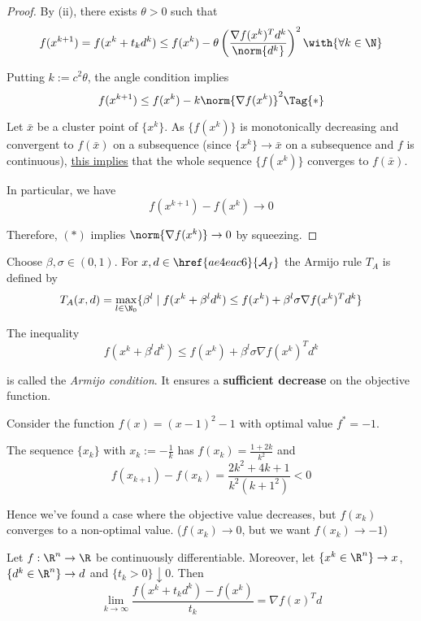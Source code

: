 \begin{proof}
  By (ii), there exists $\theta>0$ such that
  $$
    f(x^{k+1})=f(x^k+t_kd^k)\leq
    f(x^k)-\theta\left(
    \frac{\nabla f(x^k)^Td^k}{\norm{d^k}}
    \right)^2\with{\forall k\in\N}
  $$

  Putting $k:=c^2\theta$, the angle condition implies
  \begin{equation*}
    f(x^{k+1})\leq f(x^k)-k\norm{\nabla f(x^k)}^2\Tag{*}
  \end{equation*}

  Let $\bar x$ be a cluster point of $\{x^k\}$. As $\{f(x^k)\}$ is
  monotonically decreasing and convergent to $f(\bar x)$ on a subsequence
  (since $\{x^k\}\to\bar x$ on a subsequence and $f$ is continuous),
  \href{aaf3ba6}{this implies} that the whole sequence $\{f(x^k)\}$ converges
  to $f(\bar x)$.

  In particular, we have
  $$
    f(x^{k+1})-f(x^k)\to0
  $$

  Therefore, $(*)$ implies $\norm{\nabla f(x^k)}\to0$ by squeezing.
\end{proof}

\label{fefb024}

Choose $\beta,\sigma\in(0,1)$. For $x,d\in\href{ae4eac6}{\mathcal A_f}$ the
Armijo rule $T_A$ is defined by
$$
  T_A(x,d)=\max_{l\in\N_0}\{\beta^l\mid f(x^k+\beta^ld^k)\leq
  f(x^k)+\beta^l\sigma\nabla f(x^k)^Td^k\}
$$

The inequality
$$
  f(x^k+\beta^ld^k)\leq f(x^k)+\beta^l\sigma\nabla f(x^k)^Td^k
$$

is called the \textit{Armijo condition}. It ensures a \textbf{sufficient
decrease} on the objective function.

\label{ae7f42d}

Consider the function $f(x)=(x-1)^2-1$ with optimal value $f^*=-1$.

The sequence $\{x_k\}$ with $x_k:=-\frac1k$ has $f(x_k)=\frac{1+2k}{k^2}$ and
$$
  f(x_{k+1})-f(x_k)=\frac{2k^2+4k+1}{k^2(k+1^2)}<0
$$

Hence we've found a case where the objective value decreases, but $f(x_k)$
converges to a non-optimal value. ($f(x_k)\to0$, but we want $f(x_k)\to-1$)

\label{f8e1f12}

Let $f:\R^n\to\R$ be continuously differentiable. Moreover, let
$\{x^k\in\R^n\}\to x$, $\{d^k\in\R^n\}\to d$ and $\{t_k>0\}\downarrow0$. Then
$$
  \lim_{k\to\infty}\frac{f(x^k+t_kd^k)-f(x^k)}{t_k}=\nabla f(x)^Td
$$

